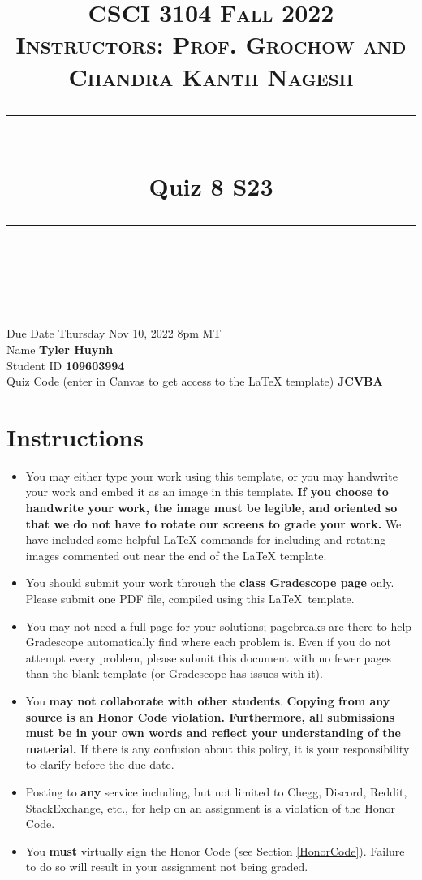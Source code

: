 \documentclass[11pt]{article}
\title{
\normalfont \normalsize 
\textsc{CSCI 3104 Fall 2022 \\ 
Instructors: Prof. Grochow and Chandra Kanth Nagesh} \\
[10pt] 
\rule{\linewidth}{0.5pt} \\[6pt] 
\huge Quiz 8 S23 \\
\rule{\linewidth}{2pt}  \\[10pt]
}
\date{}
\theoremstyle{definition}
\theoremstyle{definition}
\theoremstyle{definition}
\begin{document}

\maketitle


\noindent
Due Date \dotfill Thursday Nov 10, 2022 8pm MT \\
Name \dotfill \textbf{Tyler Huynh} \\
Student ID \dotfill \textbf{109603994} \\
Quiz Code (enter in Canvas to get access to the LaTeX template) \dotfill \textbf{JCVBA}


\tableofcontents

\section*{Instructions}
 \begin{itemize}
	\item You may either type your work using this template, or you may handwrite your work and embed it as an image in this template. \textbf{If you choose to handwrite your work, the image must be legible, and oriented so that we do not have to rotate our screens to grade your work.} We have included some helpful LaTeX commands for including and rotating images commented out near the end of the LaTeX template.
	\item You should submit your work through the \textbf{class Gradescope page} only. Please submit one PDF file, compiled using this \LaTeX \ template.
	\item You may not need a full page for your solutions; pagebreaks are there to help Gradescope automatically find where each problem is. Even if you do not attempt every problem, please submit this document with no fewer pages than the blank template (or Gradescope has issues with it).

	\item You \textbf{may not collaborate with other students}. \textbf{Copying from any source is an Honor Code violation. Furthermore, all submissions must be in your own words and reflect your understanding of the material.} If there is any confusion about this policy, it is your responsibility to clarify before the due date. 

	\item Posting to \textbf{any} service including, but not limited to Chegg, Discord, Reddit, StackExchange, etc., for help on an assignment is a violation of the Honor Code.

	\item You \textbf{must} virtually sign the Honor Code (see Section \ref{HonorCode}). Failure to do so will result in your assignment not being graded.
\end{itemize}
\end{document}
